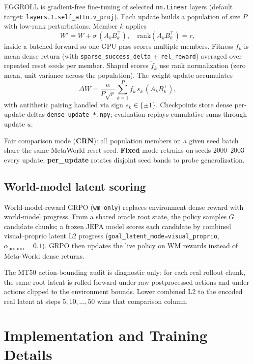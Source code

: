 EGGROLL is gradient-free fine-tuning of selected \texttt{nn.Linear} layers (default target: \texttt{layers.1.self\_attn.v\_proj}). Each update builds a population of size $P$ with low-rank perturbations. Member $k$ applies
\[
W' = W + \sigma \,(A_k B_k^\top),
\quad \mathrm{rank}(A_k B_k^\top) = r,
\]
inside a batched forward so one GPU pass scores multiple members. Fitness $f_k$ is mean dense return (with \texttt{sparse\_success\_delta} + \texttt{rel\_reward}) averaged over repeated reset seeds per member. Shaped scores $\tilde{f}_k$ use rank normalization (zero mean, unit variance across the population). The weight update accumulates
\[
\Delta W = \frac{\alpha}{P\sqrt{r}} \sum_{k=1}^{P} \tilde{f}_k \, s_k \, (A_k B_k^\top),
\]
with antithetic pairing handled via sign $s_k \in \{\pm 1\}$. Checkpoints store dense per-update deltas \texttt{dense\_update\_*.npy}; evaluation replays cumulative sums through update $u$.

Fair comparison mode (\textbf{CRN}): all population members on a given seed batch share the same MetaWorld reset seed. \textbf{Fixed} mode retrains on seeds 2000--2003 every update; \textbf{per\_update} rotates disjoint seed bands to probe generalization.

\subsection{World-model latent scoring}
\label{sec:wm-scoring}

World-model-reward GRPO (\texttt{wm\_only}) replaces environment dense reward with world-model progress. From a shared oracle root state, the policy samples $G$ candidate chunks; a frozen JEPA model scores each candidate by combined visual--proprio latent L2 progress (\texttt{goal\_latent\_mode=visual\_proprio}, $\alpha_{\mathrm{proprio}}=0.1$). GRPO then updates the live policy on WM rewards instead of Meta-World dense returns.

The MT50 action-bounding audit is diagnostic only: for each real rollout chunk, the same root latent is rolled forward under raw postprocessed actions and under actions clipped to the environment bounds. Lower combined L2 to the encoded real latent at steps $5,10,\ldots,50$ wins that comparison column.

\section{Implementation and Training Details}
\label{sec:implementation}

